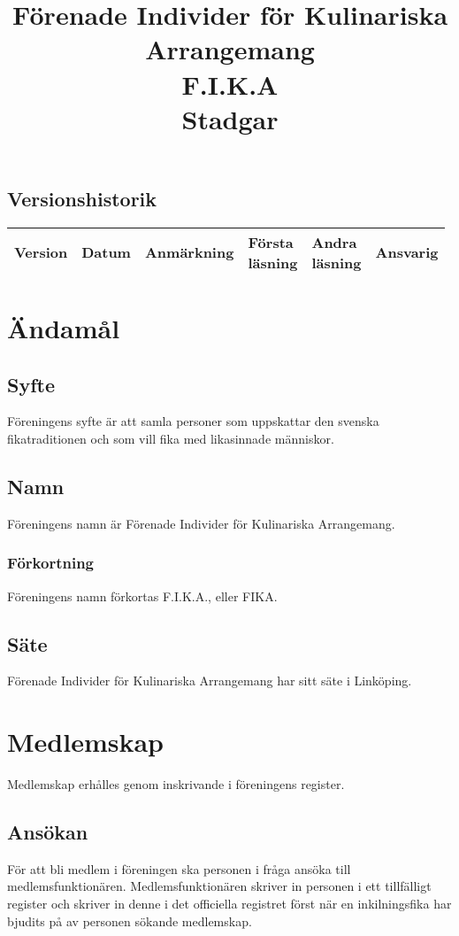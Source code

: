 \documentclass{article}
\title{Förenade Individer för Kulinariska Arrangemang \\
                F.I.K.A \\
                Stadgar}
\author{}
\date{\documentdate}
\begin{document}
\maketitle
\newpage

\subsection*{Versionshistorik}

\begin{tabularx}{\textwidth}{|l|l|X|l|l|l|}
\hline
Version & Datum & Anmärkning & \makecell{Första\\läsning} & \makecell{Andra\\läsning} & Ansvarig \\
\hline
\end{tabularx}
\newpage

\tableofcontents
\newpage
{}

\section{Ändamål}
\subsection{Syfte}
Föreningens syfte är att samla personer som uppskattar den svenska
fikatraditionen och som vill fika med likasinnade människor.
\subsection{Namn}
Föreningens namn är Förenade Individer för Kulinariska Arrangemang.
\subsubsection{Förkortning}
Föreningens namn förkortas F.I.K.A., eller FIKA.
\subsection{Säte}
Förenade Individer för Kulinariska Arrangemang har sitt säte i Linköping.


\section{Medlemskap}
Medlemskap erhålles genom inskrivande i föreningens register.
\subsection{Ansökan}
För att bli medlem i föreningen ska personen i fråga ansöka till
medlemsfunktionären. Medlemsfunktionären skriver in personen i ett tillfälligt
register och skriver in denne i det officiella registret först när en
inkilningsfika har bjudits på av personen sökande medlemskap.
\end{document}
